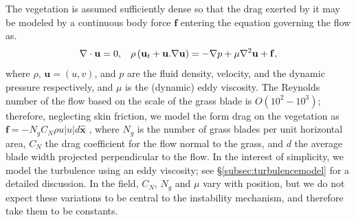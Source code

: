 \documentclass{jfm}
\newcommand{\bx}{{\boldsymbol{\hat{x}}}}
\newcommand{\bu}{\mathbf{u}}
\newcommand{\grad}{\mathbf{\nabla}}
\begin{document}
The vegetation is assumed sufficiently dense so that the drag exerted by it may be modeled by a continuous body force $\mathbf{f}$ entering the equation governing the flow as.
\begin{equation}
\grad\cdot\bu = 0,\hspace{3mm} \rho \left(\bu_{t}+\bu.\grad\bu \right) = -\grad p+\mu\grad^{2}\bu +\mathbf{f}, %
\label{navier-stokes}
\end{equation}
where $\rho$, $\bu=(u,v)$, and $p$ are the fluid density, velocity, and the dynamic pressure respectively, and $\mu$ is the (dynamic) eddy viscosity. %
The Reynolds number of the flow based on the scale of the grass blade is $O(10^2-10^3)$; therefore, neglecting skin friction, we model the form drag on the vegetation as $\mathbf{f}=-N_g C_N \rho u |u| d\bx$ \citep{Nepf99,Nepf00,Nepf04}, where  $N_g$ is the number of grass blades per unit horizontal area, $C_{N}$ the drag coefficient for the flow normal to the grass, and $d$ the average blade width projected perpendicular to the flow. 
In the interest of simplicity, we model the turbulence using an eddy viscosity; see \S\ref{subsec:turbulencemodel} for a detailed discussion. 
In the field, $C_N$, $N_g$ and $\mu$ vary with position, but we do not expect these variations to be central to the instability mechanism, and therefore take them to be constants. 
\end{document}
